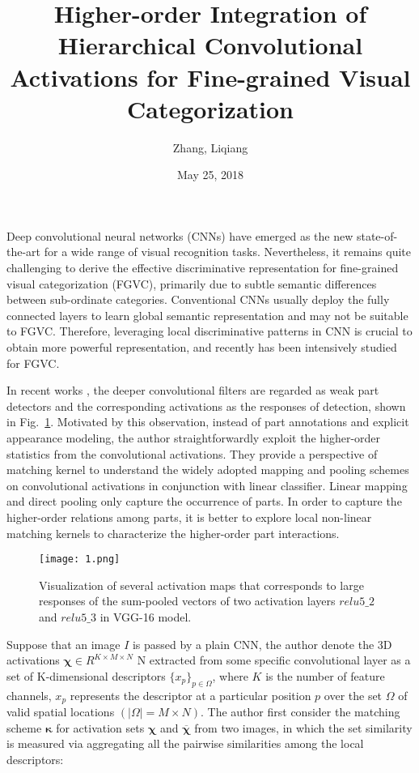 \documentclass{article}
\author{Zhang, Liqiang}
\date{May 25, 2018}
\title{Higher-order Integration of Hierarchical Convolutional Activations for Fine-grained Visual Categorization}
\begin{document}
\twocolumn
\maketitle
Deep convolutional neural networks (CNNs) have emerged as the new state-of-the-art for a wide range of visual recognition tasks. Nevertheless, it remains quite challenging to derive the effective discriminative representation for fine-grained visual categorization (FGVC), primarily due to subtle semantic differences between sub-ordinate categories. Conventional CNNs usually deploy the fully connected layers to learn global semantic representation and may not be suitable to FGVC. Therefore, leveraging local discriminative patterns in CNN is crucial to obtain more powerful representation, and recently has been intensively studied for FGVC.
\par
In recent works \cite{He2015Deep,Lecun2014Backpropagation}, the deeper convolutional filters are regarded as weak part detectors and the corresponding activations as the responses of detection, shown in Fig.~\textcolor{red}{\ref{1}}. Motivated by this observation, instead of part annotations and explicit appearance modeling, the author straightforwardly exploit the higher-order statistics from the convolutional activations. They provide a perspective of matching kernel to understand the widely adopted mapping and pooling schemes on convolutional activations in conjunction with linear classifier. Linear mapping and direct pooling only capture the occurrence of parts. In order to capture the higher-order relations among parts, it is better to explore local non-linear matching kernels to characterize the higher-order part interactions.
\begin{figure}[H]
  \centering
  \texttt{[image: 1.png]}\\
  \caption{Visualization of several activation maps that corresponds to large responses of the sum-pooled vectors of two activation layers $relu5\_2$ and $relu5\_3$ in VGG-16 model.}\label{1}
\end{figure}
\par
Suppose that an image $I$ is passed by a plain CNN, the author denote the 3D activations $\boldsymbol{\chi}\in R^{K\times M\times N}$ N extracted from some specific convolutional layer as a set of K-dimensional descriptors $\{x_p\}_{p\in\Omega}$, where $K$ is the number of feature channels, $x_p$ represents the descriptor at a particular position $p$ over the set $\Omega$ of valid spatial locations $(\mid\Omega\mid=M\times N)$. The author first consider the matching scheme $\boldsymbol{\kappa}$ for activation sets $\boldsymbol{\chi}$ and $\boldsymbol{\overline{\chi}}$ from two images, in which the set similarity is measured via aggregating all the pairwise similarities among the local descriptors:
\end{document}
